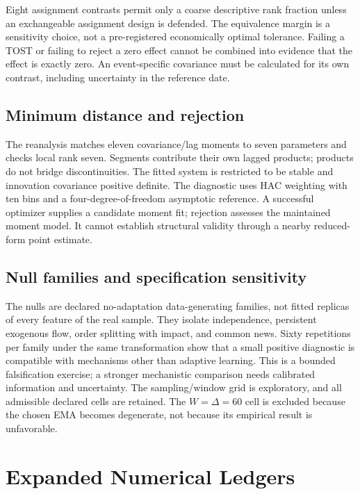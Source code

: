 Eight assignment contrasts permit only a coarse descriptive rank fraction unless an exchangeable assignment design is defended. The equivalence margin is a sensitivity choice, not a pre-registered economically optimal tolerance. Failing a TOST or failing to reject a zero effect cannot be combined into evidence that the effect is exactly zero. An event-specific covariance must be calculated for its own contrast, including uncertainty in the reference date.

\subsection{Minimum distance and rejection}
The reanalysis matches eleven covariance/lag moments to seven parameters and checks local rank seven. Segments contribute their own lagged products; products do not bridge discontinuities. The fitted system is restricted to be stable and innovation covariance positive definite. The diagnostic uses HAC weighting with ten bins and a four-degree-of-freedom asymptotic reference. A successful optimizer supplies a candidate moment fit; rejection assesses the maintained moment model. It cannot establish structural validity through a nearby reduced-form point estimate.

\subsection{Null families and specification sensitivity}
The nulls are declared no-adaptation data-generating families, not fitted replicas of every feature of the real sample. They isolate independence, persistent exogenous flow, order splitting with impact, and common news. Sixty repetitions per family under the same transformation show that a small positive diagnostic is compatible with mechanisms other than adaptive learning. This is a bounded falsification exercise; a stronger mechanistic comparison needs calibrated information and uncertainty. The sampling/window grid is exploratory, and all admissible declared cells are retained. The $W=\Delta=60$ cell is excluded because the chosen EMA becomes degenerate, not because its empirical result is unfavorable.

\section{Expanded Numerical Ledgers}
